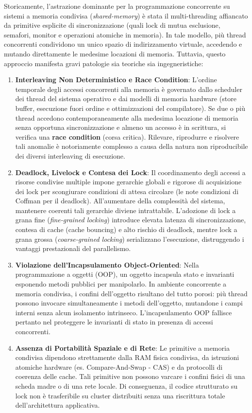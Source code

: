 Storicamente, l'astrazione dominante per la programmazione concorrente su sistemi a memoria condivisa (\textit{shared-memory}) è stata il multi-threading affiancato da primitive esplicite di sincronizzazione (quali lock di mutua esclusione, semafori, monitor e operazioni atomiche in memoria). In tale modello, più thread concorrenti condividono un unico spazio di indirizzamento virtuale, accedendo e mutando direttamente le medesime locazioni di memoria. Tuttavia, questo approccio manifesta gravi patologie sia teoriche sia ingegneristiche:
\begin{enumerate}
    \item \textbf{Interleaving Non Deterministico e Race Condition}: L'ordine temporale degli accessi concorrenti alla memoria è governato dallo scheduler dei thread del sistema operativo e dai modelli di memoria hardware (store buffer, esecuzione fuori ordine e ottimizzazioni del compilatore). Se due o più thread accedono contemporaneamente alla medesima locazione di memoria senza opportuna sincronizzazione e almeno un accesso è in scrittura, si verifica una \textbf{race condition} (corsa critica). Rilevare, riprodurre e risolvere tali anomalie è notoriamente complesso a causa della natura non riproducibile dei diversi interleaving di esecuzione.
    \item \textbf{Deadlock, Livelock e Contesa dei Lock}: Il coordinamento degli accessi a risorse condivise multiple impone gerarchie globali e rigorose di acquisizione dei lock per scongiurare condizioni di attesa circolare (le note condizioni di Coffman per il deadlock). All'aumentare della complessità del sistema, mantenere coerenti tali gerarchie diviene intrattabile. L'adozione di lock a grana fine (\textit{fine-grained locking}) introduce elevata latenza di sincronizzazione, contesa di cache (cache bouncing) e alto rischio di deadlock, mentre lock a grana grossa (\textit{coarse-grained locking}) serializzano l'esecuzione, distruggendo i vantaggi prestazionali del parallelismo.
    \item \textbf{Violazione dell'Incapsulamento Object-Oriented}: Nella programmazione a oggetti (OOP), un oggetto incapsula stato e invarianti esponendo metodi pubblici per manipolarlo. In ambiente concorrente a memoria condivisa, i confini dell'oggetto risultano del tutto porosi: più thread possono invocare simultaneamente i metodi dell'oggetto, mutandone i campi interni senza alcun isolamento intrinseco. L'incapsulamento OOP fallisce pertanto nel proteggere le invarianti di stato in presenza di accessi concorrenti.
    \item \textbf{Assenza di Portabilità Spaziale e di Rete}: Le primitive a memoria condivisa dipendono strettamente dalla RAM fisica condivisa, da istruzioni atomiche hardware (es. Compare-And-Swap - CAS) e da protocolli di coerenza delle cache. Tali primitive non possono varcare i confini fisici di una scheda madre o di una rete locale. Di conseguenza, il codice strutturato su lock non è trasferibile su cluster distribuiti senza una riscrittura totale dell'architettura applicativa.
\end{enumerate}

